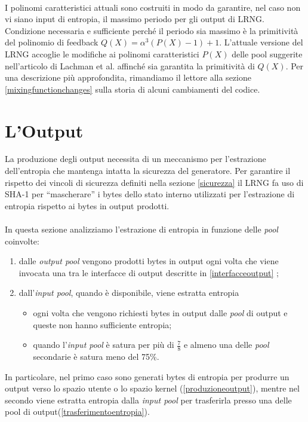 \documentclass{article}
\begin{document}
 \paragraph{}I polinomi caratteristici attuali sono costruiti in modo da
 garantire, nel caso non vi siano input di entropia, il massimo periodo per gli output di LRNG.
 Condizione necessaria e sufficiente perché il periodo sia massimo è la
 primitività del polinomio di feedback $Q(X)=\alpha^3(P(X)-1)+1$.
 L'attuale versione del LRNG accoglie le modifiche ai polinomi caratteristici
 $P(X)$ delle pool suggerite nell'articolo di Lachman et al. \cite{lach}
 affinché sia garantita la primitività di $Q(X)$. 
 \newline Per una descrizione più approfondita, rimandiamo il lettore alla
 sezione \ref{mixingfunctionchanges} sulla storia di alcuni cambiamenti del
 codice.
 
 \section{L'Output}
 La produzione degli output necessita di un meccanismo per l'estrazione
 dell'entropia che mantenga intatta la sicurezza del generatore. Per
 garantire il rispetto dei vincoli di sicurezza definiti nella sezione
 \ref{sicurezza} il LRNG fa uso di SHA-1 per ``mascherare'' i bytes dello
 stato interno utilizzati per l'estrazione di entropia rispetto ai bytes in
 output prodotti.
 \paragraph{}In questa sezione analizziamo l'estrazione di entropia in funzione
 delle \emph{pool} coinvolte:
 \begin{enumerate}
   \item dalle \emph{output pool} vengono prodotti bytes in output ogni
 volta che viene invocata una tra le interfacce di output descritte in
 \ref{interfacceoutput} ;
 \item dall'\emph{input pool}, quando è disponibile, viene
 estratta entropia 
 \begin{itemize}
   \item ogni volta che vengono richiesti bytes in output dalle
   \emph{pool} di output e queste non hanno sufficiente entropia;
   \item quando l'\emph{input pool} è satura per più di $\frac{7}{8}$ e almeno
   una delle \emph{pool} secondarie è satura meno del 75\%.
 \end{itemize}
 \end{enumerate}
 In particolare, nel primo caso sono generati bytes di entropia per produrre un
 output verso lo spazio utente o lo spazio kernel (\ref{produzioneoutput}), mentre nel
 secondo viene estratta entropia dalla \emph{input pool} per trasferirla presso
 una delle pool di output(\ref{trasferimentoentropia}).
 
\end{document}
